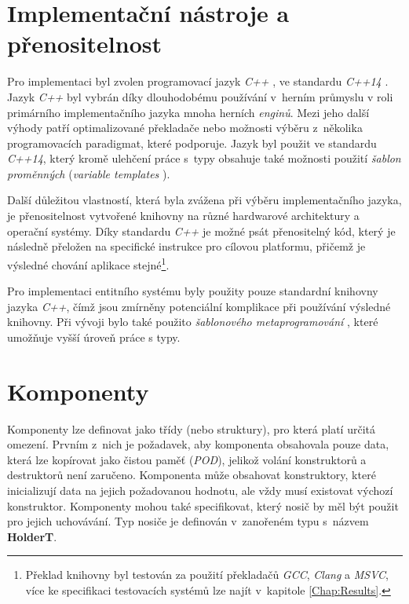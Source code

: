 \section{Implementační nástroje a přenositelnost}

Pro implementaci byl zvolen programovací jazyk \emph{C++} \cite{IsoCpp}, ve standardu \emph{C++14} \cite{Cpp14}. Jazyk \emph{C++} byl vybrán díky dlouhodobému používání v~herním průmyslu v roli primárního implementačního jazyka mnoha herních \emph{enginů}. Mezi jeho další výhody patří optimalizované překladače nebo možnosti výběru z~několika programovacích paradigmat, které podporuje. Jazyk byl použit ve standardu \emph{C++14}, který kromě ulehčení práce s~typy obsahuje také možnosti použití \emph{šablon proměnných} (\emph{variable templates} \cite{Cpp14VarTemplate}). 

Další důležitou vlastností, která byla zvážena při výběru implementačního jazyka, je přenositelnost vytvořené knihovny na různé hardwarové architektury a operační systémy. Díky standardu \emph{C++} je možné psát přenositelný kód, který je následně přeložen na specifické instrukce pro cílovou platformu, přičemž je výsledné chování aplikace stejné\footnote{Překlad knihovny byl testován za použití překladačů \emph{GCC}, \emph{Clang} a \emph{MSVC}, více ke specifikaci testovacích systémů lze najít v~kapitole \ref{Chap:Results}.}. 

Pro implementaci entitního systému byly použity pouze standardní knihovny jazyka \emph{C++}, čímž jsou zmírněny potenciální komplikace při používání výsledné knihovny. Při vývoji bylo také použito \emph{šablonového metaprogramování} \cite{CppMetaprogramming}, které umožňuje vyšší úroveň práce s typy.

\section{Komponenty}

Komponenty lze definovat jako třídy (nebo struktury), pro která platí určitá omezení. Prvním z~nich je požadavek, aby komponenta obsahovala pouze data, která lze kopírovat jako čistou paměť (\emph{POD}), jelikož volání konstruktorů a destruktorů není zaručeno. Komponenta může obsahovat konstruktory, které inicializují data na jejich požadovanou hodnotu, ale vždy musí existovat výchozí konstruktor. Komponenty mohou také specifikovat, který nosič by měl být použit pro jejich uchovávání. Typ nosiče je definován v~zanořeném typu s~názvem \textbf{HolderT}.

